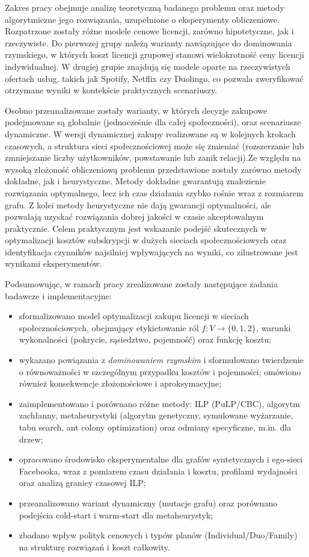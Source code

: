 Zakres pracy obejmuje analizę teoretyczną badanego problemu oraz metody algorytmiczne jego rozwiązania, uzupełnione o eksperymenty obliczeniowe. Rozpatrzone zostały różne modele cenowe licencji, zarówno hipotetyczne, jak i rzeczywiste. Do pierwszej grupy należą warianty nawiązujące do dominowania rzymskiego, w których koszt licencji grupowej stanowi wielokrotność ceny licencji indywidualnej. W drugiej grupie znajdują się modele oparte na rzeczywistych ofertach usług, takich jak Spotify, Netflix czy Duolingo, co pozwala zweryfikować otrzymane wyniki w kontekście praktycznych scenariuszy.


Osobno przeanalizowane zostały warianty, w których decyzje zakupowe podejmowane są globalnie (jednocześnie dla całej społeczności), oraz scenariusze dynamiczne. W wersji dynamicznej zakupy realizowane są w kolejnych krokach czasowych, a struktura sieci społecznościowej może się zmieniać (rozszerzanie lub zmniejszanie liczby użytkowników, powstawanie lub zanik relacji).Ze względu na wysoką złożoność obliczeniową problemu przedstawione zostały zarówno metody dokładne, jak i heurystyczne. Metody dokładne gwarantują znalezienie rozwiązania optymalnego, lecz ich czas działania szybko rośnie wraz z rozmiarem grafu. Z kolei metody heurystyczne nie dają gwarancji optymalności, ale pozwalają uzyskać rozwiązania dobrej jakości w czasie akceptowalnym praktycznie. Celem praktycznym jest wskazanie podejść skutecznych w optymalizacji kosztów subskrypcji w dużych sieciach społecznościowych oraz identyfikacja czynników najsilniej wpływających na wyniki, co zilustrowane jest wynikami eksperymentów.

Podsumowując, w ramach pracy zrealizowane zostały następujące zadania badawcze i implementacyjne:
\begin{itemize}
  \item sformalizowano model optymalizacji zakupu licencji w sieciach społecznościowych, obejmujący etykietowanie ról $f:V\to\{0,1,2\}$, warunki wykonalności (pokrycie, sąsiedztwo, pojemność) oraz funkcję kosztu;
  \item wykazano powiązania z \emph{dominowaniem rzymskim} i sformułowano twierdzenie o równoważności w szczególnym przypadku kosztów i pojemności; omówiono również konsekwencje złożonościowe i aproksymacyjne;
  \item zaimplementowano i porównano różne metody: ILP (PuLP/CBC), algorytm zachłanny, metaheurystyki (algorytm genetyczny, symulowane wyżarzanie, tabu search, ant colony optimization) oraz odmiany specyficzne, m.in. dla drzew;
  \item opracowano środowisko eksperymentalne dla grafów syntetycznych i ego-sieci Facebooka, wraz z pomiarem czasu działania i kosztu, profilami wydajności oraz analizą granicy czasowej ILP;
  \item przeanalizowano wariant dynamiczny (mutacje grafu) oraz porównano podejścia cold-start i warm-start dla metaheurystyk;
  \item zbadano wpływ polityk cenowych i typów planów (Individual/Duo/Family) na strukturę rozwiązań i koszt całkowity.
\end{itemize}

